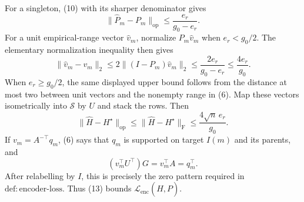 For a singleton, (10) with its sharper denominator gives
\[
 \|\widehat P_m-P_m\|_{\mathrm{op}}
 \le\frac{e_r}{g_0-e_r}.
\]
For a unit empirical-range vector \(\widehat v_m\), normalize \(P_m\widehat v_m\) when \(e_r<g_0/2\).  The elementary normalization inequality then gives
\[
 \|\widehat v_m-v_m\|_2
 \le2\|(I-P_m)\widehat v_m\|_2
 \le\frac{2e_r}{g_0-e_r}\le\frac{4e_r}{g_0}.
 \tag{12}
\]
When \(e_r\ge g_0/2\), the same displayed upper bound follows from the distance at most two between unit vectors and the nonempty range in (6).  Map these vectors isometrically into \(\mathcal S\) by \(U\) and stack the rows.  Then
\[
 \|\widehat H-H^{\star}\|_{\mathrm{op}}
 \le\|\widehat H-H^{\star}\|_{\mathrm F}
 \le\frac{4\sqrt n\,e_r}{g_0}.
 \tag{13}
\]
If \(v_m=A^{-\top}q_m\), (6) says that \(q_m\) is supported on target \(I(m)\) and its parents, and
\[
 (v_m^{\top}U^{\top})G=v_m^{\top}A=q_m^{\top}.
\]
After relabelling by \(I\), this is precisely the zero pattern required in \(\mathrm{def{:}encoder\mbox{-}loss}\).  Thus (13) bounds \(\mathcal L_{\mathrm{enc}}(\widehat H,P)\).

